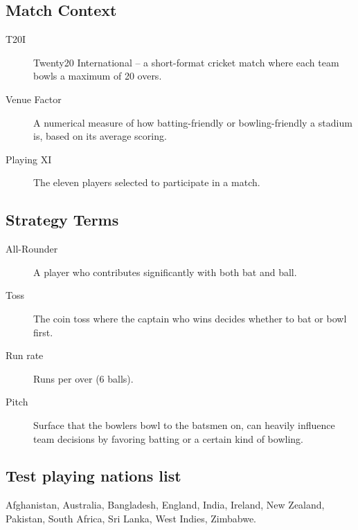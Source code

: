 \documentclass{article}[12pt]
\begin{document}
\begin{appendices}
\subsection*{Match Context}
\begin{description}
  \item[T20I] Twenty20 International – a short-format cricket match where each team bowls a maximum of 20 overs.
  \item[Venue Factor] A numerical measure of how batting-friendly or bowling-friendly a stadium is, based on its average scoring.
  \item[Playing XI] The eleven players selected to participate in a match.
\end{description}

\subsection*{Strategy Terms}
\begin{description}
  \item[All-Rounder] A player who contributes significantly with both bat and ball.
  \item[Toss] The coin toss where the captain who wins decides whether to bat or bowl first.
  \item[Run rate] Runs per over (6 balls).
  \item[Pitch] Surface that the bowlers bowl to the batsmen on, can heavily influence team decisions by favoring batting or a certain kind of bowling.
  
  
\end{description}


\subsection*{Test playing nations list}
\label{appendix:list}
Afghanistan,
Australia,
Bangladesh,
England,
India,
Ireland,
New Zealand,
Pakistan,
South Africa,
Sri Lanka,
West Indies,
Zimbabwe.



\end{appendices}
\end{document}
